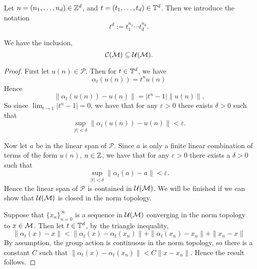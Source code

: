 \begin{definition}
    Let $n = (n_1,\ldots,n_d) \in \mathbb{Z}^d$, and $t = (t_1,\ldots,t_d) \in \mathbb{T}^d$.
    Then we introduce the notation
    \begin{equation}
        t^d := t_1^{n_1}\cdots t_d^{n_d}.
    \end{equation}    
\end{definition}

\begin{lemma}
    We have the inclusion,
    \begin{equation}
        \mathcal{C}(\mathcal{M}) \subseteq \mathcal{U}(\mathcal{M}).
    \end{equation}
\end{lemma}
\begin{proof}
    First let $u(n) \in \mathcal{P}$. Then for $t \in \mathbb{T}^d$,
    we have
    \begin{equation}
        \alpha_t(u(n)) = t^n u(n)
    \end{equation}
    Hence
    \begin{equation}
        \|\alpha_t(u(n))-u(n)\| = |t^n-1|\|u(n)\|.
    \end{equation}
    So since $\lim_{t\rightarrow 1} |t^n - 1| = 0$, we have 
    that for any $\varepsilon > 0$ there exists $\delta > 0$ such that
    \begin{equation}
        \sup_{|t| < \delta} \|\alpha_t(u(n))-u(n)\| < \varepsilon. 
    \end{equation} 
    
    Now let $a$ be in the linear span of $\mathcal{P}$. Since $a$
    is only a finite linear combination of terms of the form $u(n)$, $n \in \mathbb{Z}$, we have
    that for any $\varepsilon > 0$ there exists a $\delta > 0$ such that
    \begin{equation}
        \sup_{|t| <  \delta} \|\alpha_t(a) - a\| < \varepsilon.
    \end{equation}
    Hence the linear span of $\mathcal{P}$ is contained in $\mathcal{U}(\mathcal{M})$.
    We will be finished if we can show that $\mathcal{U}(\mathcal{M})$ is closed
    in the norm topology.
    
    Suppose that $\{x_n\}_{n=0}^\infty$ is a sequence in $\mathcal{U}(\mathcal{M})$ converging
    in the norm topology to $x \in \mathcal{M}$. Then let $t \in \mathbb{T}^d$, by the triangle inequality,
    \begin{equation}
        \|\alpha_t(x)-x\| < \|\alpha_t(x)-\alpha_t(x_n)\| + \|\alpha_t(x_n)-x_n\| + \|x_n - x\|
    \end{equation}
    By assumption, the group action is continuous in the norm topology,
    so there is a constant $C$ such that $\|\alpha_t(x)-\alpha_t(x_n)\| < C\|x-x_n\|$. 
    Hence the result follows. 
\end{proof}

